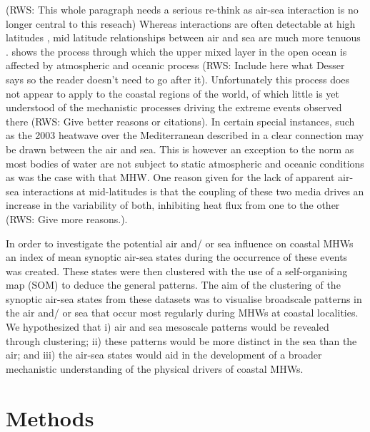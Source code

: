 \documentclass[a4paper,10pt,review]{elsarticle}
\begin{document}
(RWS: This whole paragraph needs a serious re-think as air-sea interaction is no longer central to this reseach)
Whereas interactions are often detectable at high latitudes \citep{Frankignoul1985}, mid latitude relationships between air and sea are much more tenuous \citep{Krishnamurti1988}. \citet{Deser2010} shows the process through which the upper mixed layer in the open ocean is affected by atmospheric and oceanic process (RWS: Include here what Desser says so the reader doesn't need to go after it). Unfortunately this process does not appear to apply to the coastal regions of the world, of which little is yet understood of the mechanistic processes driving the extreme events observed there (RWS: Give better reasons or citations). In certain special instances, such as the 2003 heatwave over the Mediterranean described in \citet{Garrabou2009} a clear connection may be drawn between the air and sea. This is however an exception to the norm as most bodies of water are not subject to static atmospheric and oceanic conditions as was the case with that MHW. One reason given for the lack of apparent air-sea interactions at mid-latitudes is that the coupling of these two media drives an increase in the variability of both, inhibiting heat flux from one to the other \citep{Barsugli1998} (RWS: Give more reasons.).

In order to investigate the potential air and/ or sea influence on coastal MHWs an index of mean synoptic air-sea states during the occurrence of these events was created. These states were then clustered with the use of a self-organising map (SOM) to deduce the general patterns. The aim of the clustering of the synoptic air-sea states from these datasets was to visualise broadscale patterns in the air and/ or sea that occur most regularly during MHWs at coastal localities. We hypothesized that i) air and sea mesoscale patterns would be revealed through clustering; ii) these patterns would be more distinct in the sea than the air; and iii) the air-sea states would aid in the development of a broader mechanistic understanding of the physical drivers of coastal MHWs.

\section{Methods}
\end{document}
